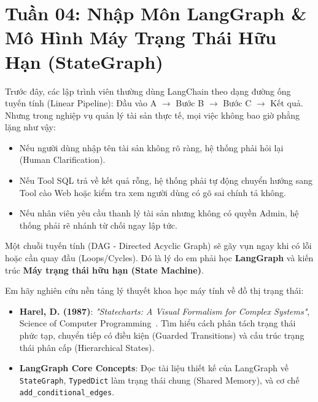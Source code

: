 ﻿\section{Tuần 04: Nhập Môn LangGraph \& Mô Hình Máy Trạng Thái Hữu Hạn (StateGraph)}
\label{sec:tuan_04}

\begin{advisorbox}
Trước đây, các lập trình viên thường dùng LangChain theo dạng đường ống tuyến tính (Linear Pipeline): Đầu vào A $\rightarrow$ Bước B $\rightarrow$ Bước C $\rightarrow$ Kết quả. Nhưng trong nghiệp vụ quản lý tài sản thực tế, mọi việc không bao giờ phẳng lặng như vậy:
\begin{itemize}[leftmargin=1.5em]
    \item Nếu người dùng nhập tên tài sản không rõ ràng, hệ thống phải hỏi lại (Human Clarification).
    \item Nếu Tool SQL trả về kết quả rỗng, hệ thống phải tự động chuyển hướng sang Tool cào Web hoặc kiểm tra xem người dùng có gõ sai chính tả không.
    \item Nếu nhân viên yêu cầu thanh lý tài sản nhưng không có quyền Admin, hệ thống phải rẽ nhánh từ chối ngay lập tức.
\end{itemize}
Một chuỗi tuyến tính (DAG - Directed Acyclic Graph) sẽ gãy vụn ngay khi có lỗi hoặc cần quay đầu (Loops/Cycles). Đó là lý do em phải học \textbf{LangGraph} và kiến trúc \textbf{Máy trạng thái hữu hạn (State Machine)}.
\end{advisorbox}

\begin{literaturebox}
Em hãy nghiên cứu nền tảng lý thuyết khoa học máy tính về đồ thị trạng thái:
\begin{itemize}[leftmargin=1.5em]
    \item \textbf{Harel, D. (1987)}: \textit{"Statecharts: A Visual Formalism for Complex Systems"}, Science of Computer Programming~\cite{harel1987statecharts}. Tìm hiểu cách phân tách trạng thái phức tạp, chuyển tiếp có điều kiện (Guarded Transitions) và cấu trúc trạng thái phân cấp (Hierarchical States).
    \item \textbf{LangGraph Core Concepts}: Đọc tài liệu thiết kế của LangGraph về \texttt{StateGraph}, \texttt{TypedDict} làm trạng thái chung (Shared Memory), và cơ chế \texttt{add\_conditional\_edges}.
\end{itemize}
\end{literaturebox}

